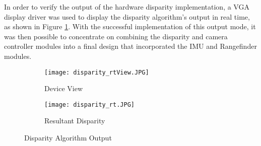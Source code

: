 \par
In order to verify the output of the hardware disparity implementation, a VGA display driver was used to display the disparity algorithm's output in real time, as shown in Figure \ref{disparityFin}. With the successful implementation of this output mode, it was then possible to concentrate on combining the disparity and camera controller modules into a final design that incorporated the IMU and Rangefinder modules.
\par
\begin{figure}[H] 
	\begin{subfigure}{0.5\textwidth}
	\centering
		\texttt{[image: disparity\_rtView.JPG]}
		\caption{Device View}
	\end{subfigure}
	\begin{subfigure}{0.5\textwidth}
	\centering
		\texttt{[image: disparity\_rt.JPG]}
		\caption{Resultant Disparity}
	\end{subfigure}
	\caption{Disparity Algorithm Output}
	\label{disparityFin}
\end{figure}
